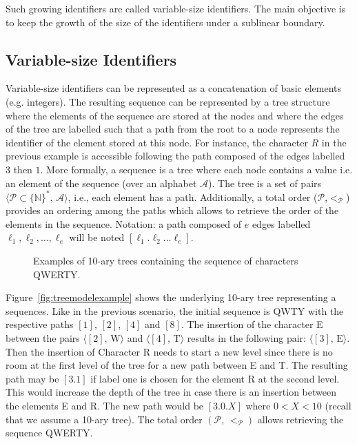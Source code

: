 Such growing identifiers are called variable-size identifiers. The main
objective is to keep the growth of the size of the identifiers under a sublinear
boundary.

\subsection{Variable-size Identifiers}
\label{subsec:variable}

Variable-size identifiers can be represented as a concatenation of basic
elements (e.g. integers). The resulting sequence can be represented by a tree
structure where the elements of the sequence are stored at the nodes and where
the edges of the tree are labelled such that a path from the root to a node
represents the identifier of the element stored at this node. For instance, the
character $R$ in the previous example is accessible following the path composed
of the edges labelled $3$ then $1$. More formally, a sequence is a tree where
each node contains a value i.e. an element of the sequence (over an alphabet
$\mathcal{A}$). The tree is a set of pairs
$\langle\mathcal{P}\subset\{\mathbb{N}\}^*,\, \mathcal{A} \rangle$, i.e., each
element has a path. Additionally, a total order
($\mathcal{P}$,$<_{\mathcal{P}}$) provides an ordering among the paths which
allows to retrieve the order of the elements in the sequence. Notation: a path
composed of $e$ edges labelled $\ell_1,\ell_2,\ldots,\ell_e$ will be noted
$[\ell_1.\ell_2\ldots\ell_e]$.

\begin{figure*}
  \centering
  \hspace{20pt}
  \caption{Examples of 10-ary trees containing the sequence of characters
    QWERTY.}
\end{figure*}


Figure~\ref{fig:treemodelexample} shows the underlying 10-ary tree representing
a sequences. Like in the previous scenario, the initial sequence is QWTY with
the respective paths $[1]$, $[2]$, $[4]$ and $[8]$. The insertion of the
character E between the pairs $\langle [2],\, \text{W}\rangle$ and
$\langle [4],\, \text{T}\rangle$ results in the following pair:
$\langle [3],\, \text{E} \rangle$. Then the insertion of Character R needs to
start a new level since there is no room at the first level of the tree for a
new path between E and T. The resulting path may be $[3.1]$ if label one is
chosen for the element R at the second level. This would increase the depth of
the tree in case there is an insertion between the elements E and R. The new
path would be $[3.0.X]$ where $0<X<10$ (recall that we assume a 10-ary
tree). The total order $(\mathcal{P},\,<_\mathcal{P})$ allows retrieving the
sequence QWERTY.

